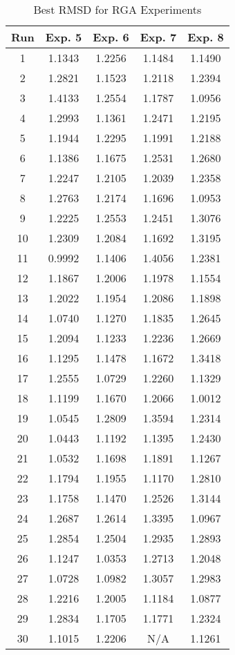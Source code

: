 \begin{table}
	\centering
	\begin{tabular}{ | c | c | c | c | c | }
		\hline
		Run & Exp. 5 & Exp. 6 & Exp. 7 & Exp. 8 \\ \hline
		1 & 1.1343 & 1.2256 & 1.1484 & 1.1490 \\ \hline
		2 & 1.2821 & 1.1523 & 1.2118 & 1.2394 \\ \hline
		3 & 1.4133 & 1.2554 & 1.1787 & 1.0956 \\ \hline
		4 & 1.2993 & 1.1361 & 1.2471 & 1.2195 \\ \hline
		5 & 1.1944 & 1.2295 & 1.1991 & 1.2188 \\ \hline
		6 & 1.1386 & 1.1675 & 1.2531 & 1.2680 \\ \hline
		7 & 1.2247 & 1.2105 & 1.2039 & 1.2358 \\ \hline
		8 & 1.2763 & 1.2174 & 1.1696 & 1.0953 \\ \hline
		9 & 1.2225 & 1.2553 & 1.2451 & 1.3076 \\ \hline
		10 & 1.2309 & 1.2084 & 1.1692 & 1.3195 \\ \hline
		11 & 0.9992 & 1.1406 & 1.4056 & 1.2381 \\ \hline
		12 & 1.1867 & 1.2006 & 1.1978 & 1.1554 \\ \hline
		13 & 1.2022 & 1.1954 & 1.2086 & 1.1898 \\ \hline
		14 & 1.0740 & 1.1270 & 1.1835 & 1.2645 \\ \hline
		15 & 1.2094 & 1.1233 & 1.2236 & 1.2669 \\ \hline
		16 & 1.1295 & 1.1478 & 1.1672 & 1.3418 \\ \hline
		17 & 1.2555 & 1.0729 & 1.2260 & 1.1329 \\ \hline
		18 & 1.1199 & 1.1670 & 1.2066 & 1.0012 \\ \hline
		19 & 1.0545 & 1.2809 & 1.3594 & 1.2314 \\ \hline
		20 & 1.0443 & 1.1192 & 1.1395 & 1.2430 \\ \hline
		21 & 1.0532 & 1.1698 & 1.1891 & 1.1267 \\ \hline
		22 & 1.1794 & 1.1955 & 1.1170 & 1.2810 \\ \hline
		23 & 1.1758 & 1.1470 & 1.2526 & 1.3144 \\ \hline
		24 & 1.2687 & 1.2614 & 1.3395 & 1.0967 \\ \hline
		25 & 1.2854 & 1.2504 & 1.2935 & 1.2893 \\ \hline
		26 & 1.1247 & 1.0353 & 1.2713 & 1.2048 \\ \hline
		27 & 1.0728 & 1.0982 & 1.3057 & 1.2983 \\ \hline
		28 & 1.2216 & 1.2005 & 1.1184 & 1.0877 \\ \hline
		29 & 1.2834 & 1.1705 & 1.1771 & 1.2324 \\ \hline
		30 & 1.1015 & 1.2206 & N/A & 1.1261 \\ \hline
	\end{tabular}
	\caption{Best RMSD for RGA Experiments}
\end{table}

